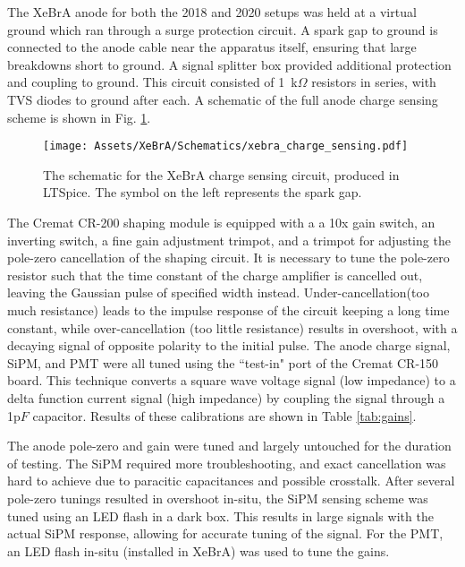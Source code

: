 The XeBrA anode for both the 2018 and 2020 setups was held at a virtual ground which ran through a surge protection circuit.
A spark gap to ground is connected to the anode cable near the apparatus itself, ensuring that large breakdowns  short to ground.
A signal splitter box provided additional protection and coupling to ground.
This circuit consisted of 1~k$\Omega$ resistors in series, with TVS diodes to ground after each.
A schematic of the full anode charge sensing scheme is shown in Fig. \ref{fig:xebra_charge_sensing}.

\begin{figure}
    \centering
    \texttt{[image: Assets/XeBrA/Schematics/xebra\_charge\_sensing.pdf]}
    \caption[The schematic for the XeBrA charge sensing circuit, produced in LTSpice.]%
    {The schematic for the XeBrA charge sensing circuit, produced in LTSpice.
    The symbol on the left represents the spark gap.}
    \label{fig:xebra_charge_sensing}
\end{figure}

The Cremat CR-200 shaping module is equipped with a a 10x gain switch, an inverting switch, a fine gain adjustment trimpot, and a trimpot for adjusting the pole-zero cancellation of the shaping circuit.
It is necessary to tune the pole-zero resistor such that the time constant of the charge amplifier is cancelled out, leaving the 
Gaussian pulse of specified width instead.
Under-cancellation(too much resistance) leads to the impulse response of the circuit keeping a long time constant, while over-cancellation (too little resistance) results in overshoot, with a decaying signal of opposite polarity to the initial pulse.
The anode charge signal, SiPM, and PMT were all tuned using the ``test-in" port of the Cremat CR-150 board.
This technique converts a square wave voltage signal (low impedance) to a delta function current signal (high impedance) by coupling the signal through a 1p$F$ capacitor.
Results of these calibrations are shown in Table \ref{tab:gains}.

The anode pole-zero and gain were tuned and largely untouched for the duration of testing.
The SiPM required more troubleshooting, and exact cancellation was hard to achieve due to paracitic capacitances and possible crosstalk.
After several pole-zero tunings resulted in overshoot in-situ, the SiPM sensing scheme was tuned using an LED flash in a dark box.
This results in large signals with the actual SiPM response, allowing for accurate tuning of the signal.
For the PMT, an LED flash in-situ (installed in XeBrA) was used to tune the gains.

